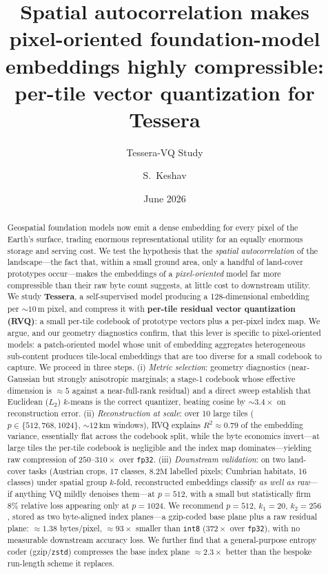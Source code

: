 \documentclass[11pt]{article}
\title{\bfseries Spatial autocorrelation makes pixel-oriented
foundation-model embeddings highly compressible:\\
per-tile vector quantization for Tessera}
\author[1]{Tessera-VQ Study}
\author[1]{S.\ Keshav}
\affil[1]{Department of Computer Science and Technology, University of Cambridge\\
\texttt{sk818@cam.ac.uk}}
\date{June 2026}
\begin{document}
\maketitle

\begin{abstract}
Geospatial foundation models now emit a dense embedding for every pixel of the
Earth's surface, trading enormous representational utility for an equally
enormous storage and serving cost. We test the hypothesis that the
\emph{spatial autocorrelation} of the landscape---the fact that, within a small
ground area, only a handful of land-cover prototypes occur---makes the
embeddings of a \emph{pixel-oriented} model far more compressible than their
raw byte count suggests, at little cost to downstream utility. We study
\textbf{Tessera}, a self-supervised model producing a 128-dimensional embedding
per ${\sim}10\,\mathrm{m}$ pixel, and compress it with \textbf{per-tile residual
vector quantization (RVQ)}: a small per-tile codebook of prototype vectors plus
a per-pixel index map. We argue, and our geometry diagnostics confirm, that this
lever is specific to pixel-oriented models: a patch-oriented model whose unit of
embedding aggregates heterogeneous sub-content produces tile-local embeddings
that are too diverse for a small codebook to capture.
We proceed in three steps. (i) \emph{Metric selection}: geometry diagnostics
(near-Gaussian but strongly anisotropic marginals; a stage-1 codebook whose
effective dimension is ${\approx}5$ against a near-full-rank residual) and a
direct sweep establish that Euclidean ($L_2$) $k$-means is the correct
quantizer, beating cosine by ${\sim}3.4\times$ on reconstruction error.
(ii) \emph{Reconstruction at scale}: over 10 large tiles ($p\in\{512,768,1024\}$,
${\sim}12\,\mathrm{km}$ windows), RVQ explains $R^2\approx0.79$ of the embedding
variance, essentially flat across the codebook split, while the byte economics
invert---at large tiles the per-tile codebook is negligible and the index map
dominates---yielding raw compression of $250$--$310\times$ over \texttt{fp32}.
(iii) \emph{Downstream validation}: on two land-cover tasks (Austrian crops,
17 classes, $8.2\mathrm{M}$ labelled pixels; Cumbrian habitats, 16 classes) under
spatial group $k$-fold, reconstructed embeddings classify
\emph{as well as raw}---if anything VQ mildly denoises them---at $p=512$, with a
small but statistically firm $8\%$ relative loss appearing only at $p=1024$.
We recommend $p=512,\,k_1=20,\,k_2=256$, stored as two byte-aligned index
planes---a gzip-coded base plane plus a raw residual plane: ${\approx}1.38$
bytes/pixel, ${\approx}93\times$ smaller than \texttt{int8} ($372\times$ over
\texttt{fp32}), with no measurable downstream accuracy loss. We further find that
a general-purpose entropy coder (gzip/\texttt{zstd}) compresses the base index
plane ${\approx}2.3\times$ better than the bespoke run-length scheme it replaces.
\end{abstract}
\end{document}
